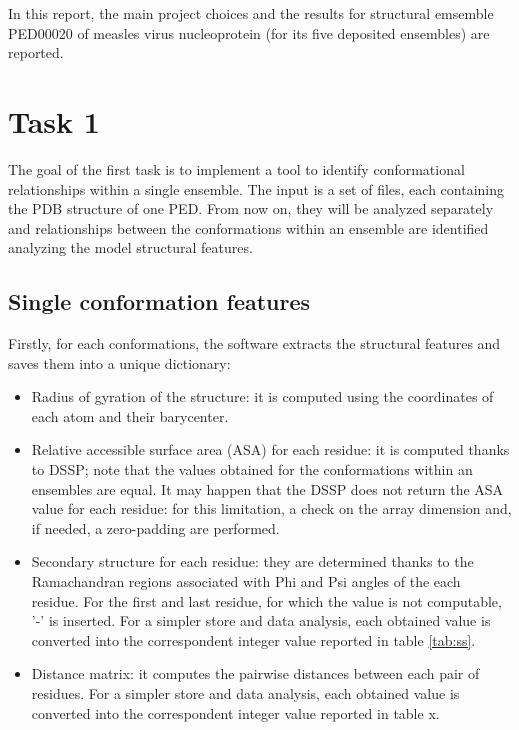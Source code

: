 In this report, the main project choices and the results for structural emsemble PED00020 of measles virus nucleoprotein (for its five deposited ensembles) are reported.

\section{Task 1}\label{sec:task1}
\graphicspath{ {./figures/} }

The goal of the first task is to implement a tool to identify conformational relationships within a single ensemble. The input is a set of files, each containing the PDB structure of one PED. From now on, they will be analyzed separately and relationships between the conformations within an ensemble are identified analyzing the model structural features. 


\subsection{Single conformation features}

Firstly, for each conformations, the software extracts the structural features and saves them into a unique dictionary:
\begin{itemize}
\item Radius of gyration of the structure: it is computed using the coordinates of each atom and their barycenter.
\item Relative accessible surface area (ASA) for each residue: it is computed thanks to DSSP; note that the values obtained for the conformations within an ensembles are equal. It may happen that the DSSP does not return the ASA value for each residue: for this limitation, a check on the array dimension and, if needed, a zero-padding are performed. 
\item Secondary structure for each residue: they are determined thanks to the Ramachandran regions associated with Phi and Psi angles of the each residue. For the first and last residue, for which the value is not computable, '-' is inserted. For a simpler store and data analysis, each obtained value is converted into the correspondent integer value reported in table \ref{tab:ss}. 
\item Distance matrix: it computes the pairwise distances between each pair of residues. For a simpler store and data analysis, each obtained value is converted into the correspondent integer value reported in table x.
\end{itemize}

